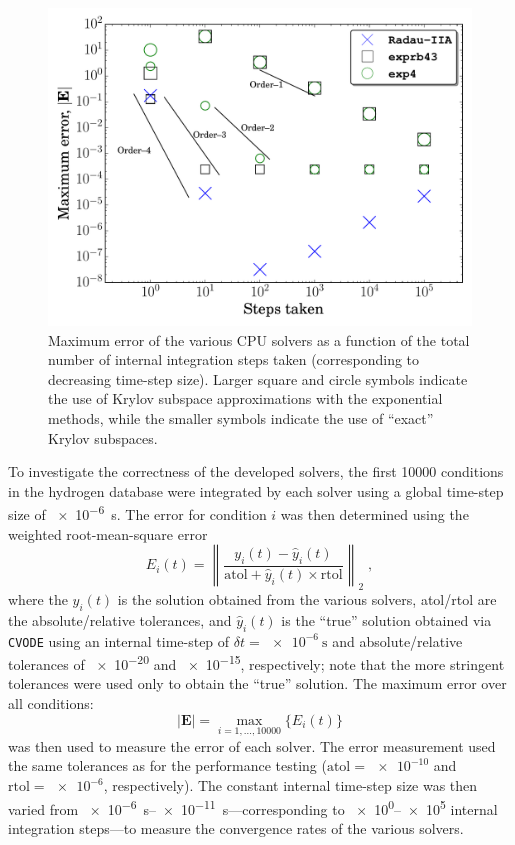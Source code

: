 \documentclass[preprint,review,11pt]{elsarticle}
\begin{document}
\begin{figure}[htbp]
  \centering
  \includegraphics[width=0.7\linewidth]{c_nco_nosmem_error.pdf}
  \caption{Maximum error of the various CPU solvers as a function of the total number of internal integration steps taken (corresponding to decreasing time-step size).
  Larger square and circle symbols indicate the use of Krylov subspace approximations with the exponential methods, while the smaller symbols indicate the use of ``exact'' Krylov subspaces.}
  \label{F:convergence}
 \end{figure}

To investigate the correctness of the developed solvers, the first \num{10000} conditions in the hydrogen database were integrated by each solver using a global time-step size of \SI{e-6}{\second}.
The error for condition $i$ was then determined using the weighted root-mean-square error
\begin{equation}
 E_i(t) = \left\lVert\frac{y_i(t) - \hat{y}_i(t)}{\text{atol} + \hat{y}_i(t) \times \text{rtol}}\right\rVert_2 \;,
\end{equation}
where the $y_i(t)$ is the solution obtained from the various solvers, atol\slash rtol are the absolute\slash relative tolerances, and $\hat{y}_i(t)$ is the ``true'' solution obtained via \texttt{CVODE} using an internal time-step of $\delta t = \SI{e-6}{\second}$ and absolute\slash relative tolerances of \num{e-20} and \num{e-15}, respectively; note that the more stringent tolerances were used only to obtain the ``true'' solution.
The maximum error over all conditions:
\begin{equation}
 \left\lvert\textbf{E}\right\rvert = \max_{i= 1, \dots, \num{10000}}\{E_i(t)\}
\end{equation}
was then used to measure the error of each solver.
The error measurement used the same tolerances as for the performance testing ($\text{atol} = \num{e-10}$ and $\text{rtol} = \num{e-6}$, respectively).
The constant internal time-step size was then varied from \SIrange{e-6}{e-11}{\second}---corresponding to \numrange[retain-zero-exponent]{e0}{e5} internal integration steps---to measure the convergence rates of the various solvers.
\end{document}
